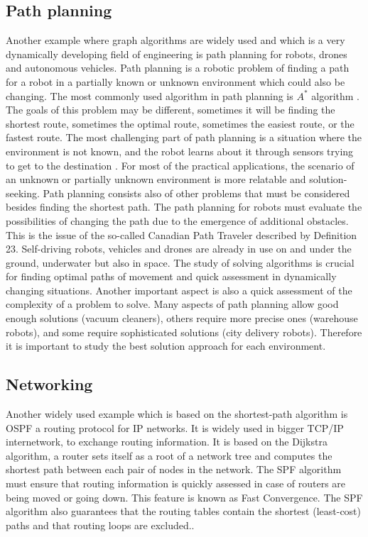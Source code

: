 \subsection{Path planning}
Another example where graph algorithms are widely used and which is a very dynamically developing field of engineering is path planning for robots, drones 
and autonomous vehicles. Path planning is a robotic problem of finding a path for a robot in a partially known or unknown environment which could also be changing. The most 
commonly used algorithm in path planning is $A^*$ algorithm \cite{3}. The goals of this problem may be different, sometimes it will be finding the shortest route, 
sometimes the optimal route, sometimes the easiest route, or the fastest route. The most challenging part of path planning is a situation where the environment is not known, 
and the robot learns about it through sensors trying to get to the destination \cite{20}. For most of the practical applications, the scenario of an unknown or
partially unknown environment is more relatable and solution-seeking. Path planning consists also of other problems that must be considered besides finding the shortest path.
The path planning for robots must evaluate the possibilities of changing the path due to the emergence of additional obstacles. This is the issue of the so-called Canadian Path Traveler
described by Definition 23. Self-driving robots, vehicles and drones are already in use on and under the ground, underwater but also in space. The study of solving algorithms
is crucial for finding optimal paths of movement and quick assessment in dynamically changing situations. Another important aspect is also a quick assessment of the
complexity of a problem to solve. Many aspects of path planning allow good enough solutions (vacuum cleaners), others require more precise ones (warehouse robots), and some require 
sophisticated solutions (city delivery robots)\cite{22}. Therefore it is important to study the best solution approach for each environment.
\subsection{Networking}
Another widely used example which is based on the shortest-path algorithm is OSPF a routing protocol for  IP networks. It is widely used in bigger TCP/IP internetwork, 
to exchange routing information. It is based on the Dijkstra algorithm, a router sets itself as a root of a network tree and computes the shortest path between each pair 
of nodes in the network. The SPF algorithm must ensure that routing information is quickly assessed in case of routers are being moved or going down. 
This feature is known as Fast Convergence. The SPF algorithm also guarantees that the routing tables contain the shortest (least-cost) paths and that routing loops are excluded.\cite{23}.
